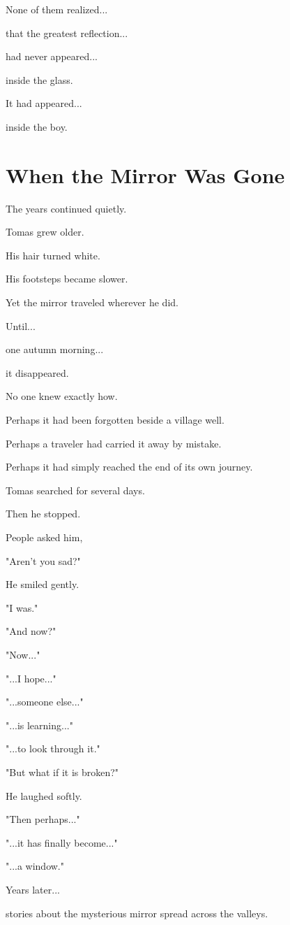 \documentclass[12pt,openany]{book}
\begin{document}
None of them realized...

that the greatest reflection...

had never appeared...

inside the glass.

It had appeared...

inside the boy.
\section*{When the Mirror Was Gone}

The years continued quietly.

Tomas grew older.

His hair turned white.

His footsteps became slower.

Yet the mirror traveled wherever he did.

Until...

one autumn morning...

it disappeared.

No one knew exactly how.

Perhaps it had been forgotten beside a village well.

Perhaps a traveler had carried it away by mistake.

Perhaps it had simply reached the end of its own journey.

Tomas searched for several days.

Then he stopped.

People asked him,

"Aren't you sad?"

He smiled gently.

"I was."

"And now?"

"Now..."

"...I hope..."

"...someone else..."

"...is learning..."

"...to look through it."

"But what if it is broken?"

He laughed softly.

"Then perhaps..."

"...it has finally become..."

"...a window."

Years later...

stories about the mysterious mirror spread across the valleys.
\end{document}
